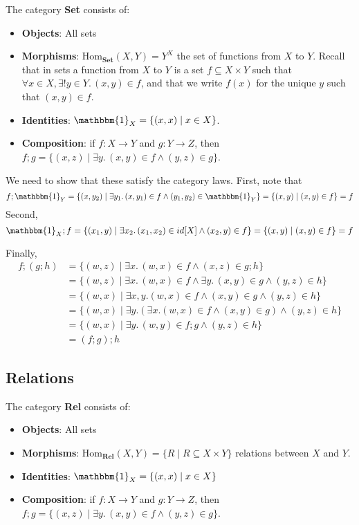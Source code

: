 \documentclass{lecturenotes}
\renewcommand{\hom}[3][]{\ensuremath{\text{Hom}_{#1}(#2, #3)}}
\newcommand{\id}[1][]{\ensuremath{\mathbbm{1}_{#1}}}
\newcommand{\Set}{\textbf{Set}\xspace}
\newcommand{\Rel}{\textbf{Rel}\xspace}
\begin{document}
The category \Set consists of:
\begin{itemize}
\item \textbf{Objects}: All sets
\item \textbf{Morphisms}: $\hom[\Set]{X}{Y} = Y^X$ the set of functions from $X$ to $Y$.
  Recall that in sets a function from $X$ to $Y$ is a set $f \subseteq X \times Y$ such that $\forall x \in X, \exists ! y \in Y.\, (x, y) \in f$, and that we write $f(x)$ for the unique $y$ such that $(x, y) \in f$.
\item \textbf{Identities}: $\id[X] = \{(x, x) \mid x \in X\}$.
\item \textbf{Composition}: if $f : X \to Y$ and $g : Y \to Z$, then $f; g = \{ (x, z) \mid \exists y.\, (x, y) \in f \land (y, z) \in g\}$.
\end{itemize}

We need to show that these satisfy the category laws.
First, note that
$$f; \id[Y] = \{(x, y_2) \mid \exists y_1.\, (x, y_1) \in f \land (y_1, y_2) \in \id[Y]\} = \{(x, y) \mid (x, y) \in f\} = f$$
Second,
$$\id[X]; f = \{(x_1, y) \mid \exists x_2.\, (x_1, x_2) \in id[X] \land (x_2, y) \in f\} = \{(x, y) \mid (x, y) \in f\} = f$$

Finally,
$$
\begin{array}{ll}
  f; (g; h) &= \{(w, z) \mid \exists x.\, (w, x) \in f \land (x, z) \in g; h\}\\
            &= \{(w, z) \mid \exists x.\, (w, x) \in f \land \exists y.\, (x, y) \in g \land (y, z) \in h\}\\
            &= \{(w, x) \mid \exists x, y. (w, x) \in f \land(x, y) \in g \land (y, z) \in h\}\\
            &= \{(w, x) \mid \exists y. (\exists x. (w, x) \in f \land(x, y) \in g) \land (y, z) \in h\}\\
            &=\{(w, x) \mid \exists y.\, (w, y) \in f; g \land (y, z) \in h\}\\
            &=(f; g); h
\end{array}
$$

\subsection{Relations}
\label{sec:relations}

The category \Rel consists of:
\begin{itemize}
\item \textbf{Objects}: All sets
\item \textbf{Morphisms}: $\hom[\Rel]{X}{Y} = \{R \mid R \subseteq X \times Y\}$ relations between $X$ and $Y$.
\item \textbf{Identities}: $\id[X] = \{(x, x) \mid x \in X\}$
\item \textbf{Composition}: if $f : X \to Y$ and $g : Y \to Z$, then $f; g = \{ (x, z) \mid \exists y.\, (x, y) \in f \land (y, z) \in g\}$.
\end{itemize}
\end{document}

